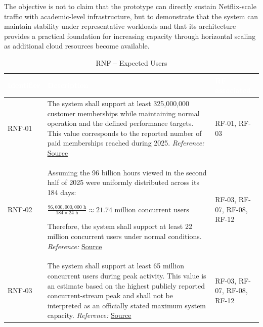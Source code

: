 \documentclass{article}
\begin{document}
The objective is not to claim that the prototype can directly sustain Netflix-scale traffic with academic-level infrastructure, but to demonstrate that the system can maintain stability under representative workloads and that its architecture provides a practical foundation for increasing capacity through horizontal scaling as additional cloud resources become available. 



\begin{table}[H]

\centering

\small

\renewcommand{\arraystretch}{1.35}

\caption{RNF -- Expected Users}

\label{tab:rnf_expected_users}

\begin{tabularx}{\textwidth}{|p{2.2cm}|X|p{3.5cm}|}

\hline

\rowcolor[HTML]{1F2937}

\textcolor{white}{\textbf{Identifier}} &
\textcolor{white}{\textbf{Description}} &
\textcolor{white}{\textbf{RF associated}} \\ \hline

RNF-01 &
The system shall support at least 325{,}000{,}000 customer memberships while maintaining normal operation and the defined performance targets. This value corresponds to the reported number of paid memberships reached during 2025.
\textit{Reference:} \href{https://www.sec.gov/Archives/edgar/data/1065280/000119312526159286/d20613ddef14a.htm}{Source}
&
RF-01, RF-03 \\ \hline

RNF-02 &
Assuming the 96 billion hours viewed in the second half of 2025 were uniformly distributed across its 184 days:

\(\displaystyle
\frac{96{,}000{,}000{,}000\text{ h}}
{184\times24\text{ h}}
\approx 21.74\text{ million concurrent users}
\)

Therefore, the system shall support at least 22 million concurrent users under normal conditions.
\textit{Reference:} \href{https://about.netflix.com/en/news/what-we-watched-the-second-half-of-2025}{Source}
&
RF-03, RF-07, RF-08, RF-12 \\ \hline

RNF-03 &
The system shall support at least 65 million concurrent users during peak activity. This value is an estimate based on the highest publicly reported concurrent-stream peak and shall not be interpreted as an officially stated maximum system capacity.
\textit{Reference:} \href{https://about.netflix.com/en/news/jake-paul-vs-mike-tyson-over-108-million-live-global-viewers}{Source}
&
RF-03, RF-07, RF-08, RF-12 \\ \hline

\end{tabularx}

\end{table}
\end{document}
